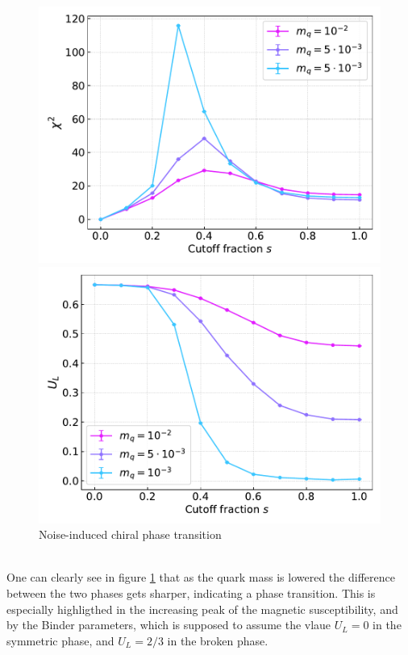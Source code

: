 \begin{figure}[h]
\begin{minipage}{0.45\textwidth}
\end{minipage}
\begin{minipage}{0.45\textwidth}	
	\includegraphics[scale=0.48]{figures/chiral_PT/chi2.pdf}
\end{minipage}
\hfill
\begin{minipage}{0.45\textwidth}
	\includegraphics[scale=0.48]{figures/chiral_PT/binder.pdf}
\end{minipage}
\hfill
\caption{Noise-induced chiral phase transition}
\label{fig:chiral:symmetry_breaking}
\end{figure}\\
One can clearly see in figure \ref{fig:chiral:symmetry_breaking} that as the quark  mass is lowered the difference between the two phases gets sharper, indicating a phase transition. 
This is especially highligthed in the increasing peak of the magnetic susceptibility, and by the Binder parameters, which is supposed to assume the vlaue $U_L = 0$ in the symmetric phase, and $U_L=2/3$ in the broken phase.
\newpage

